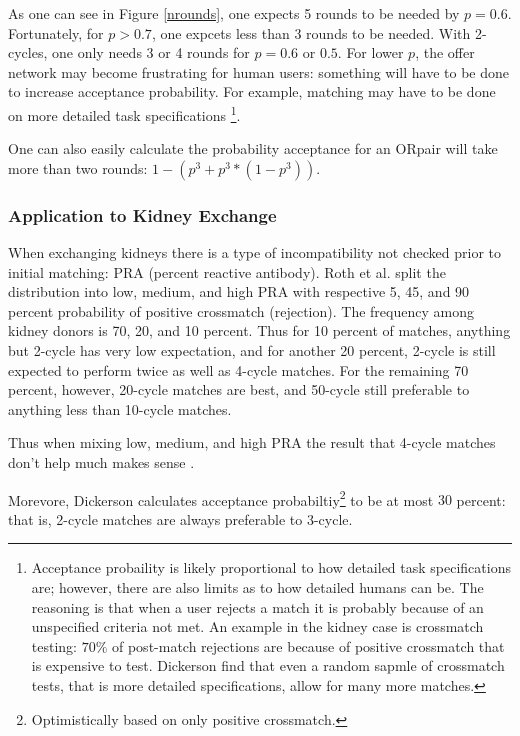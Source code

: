 \documentclass[main.tex]{subfiles}
\begin{document}
As one can see in Figure \ref{nrounds}, one expects 5 rounds to be needed by $p = 0.6$. Fortunately, for $p > 0.7$, one expcets less than 3 rounds to be needed. With 2-cycles, one only needs 3 or 4 rounds for $p = 0.6$ or $0.5$. For lower $p$, the offer network may become frustrating for human users: something will have to be done to increase acceptance probability. For example, matching may have to be done on more detailed task specifications \footnote{Acceptance probaility is likely proportional to how detailed task specifications are; however, there are also limits as to how detailed humans can be. The reasoning is that when a user rejects a match it is probably because of an unspecified criteria not met. An example in the kidney case is crossmatch testing: $70\%$ of post-match rejections are because of positive crossmatch that is expensive to test. Dickerson \cite{Dick} find that even a random sapmle of crossmatch tests, that is more detailed specifications, allow for many more matches.}.

One can also easily calculate the probability acceptance for an ORpair will take more than two rounds: $1 - (p^3 + p^3 * (1 - p^3))$.

\subsubsection{Application to Kidney Exchange}
When exchanging kidneys there is a type of incompatibility not checked prior to initial matching: PRA (percent reactive antibody). Roth et al. \cite{Rot2} split the distribution into low, medium, and high PRA with respective 5, 45, and 90 percent probability of positive crossmatch (rejection). The frequency among kidney donors is 70, 20, and 10 percent. Thus for 10 percent of matches, anything but 2-cycle has very low expectation, and for another 20 percent, 2-cycle is still expected to perform twice as well as 4-cycle matches. For the remaining 70 percent, however, 20-cycle matches are best, and 50-cycle still preferable to anything less than 10-cycle matches.

Thus when mixing low, medium, and high PRA the result that 4-cycle matches don't help much makes sense \cite{Rot2}.

Morevore, Dickerson \cite{Dick} \cite{Dick3} calculates acceptance probabiltiy\footnote{Optimistically based on only positive crossmatch.} to be at most $30$ percent: that is, 2-cycle matches are always preferable to 3-cycle.
\end{document}
